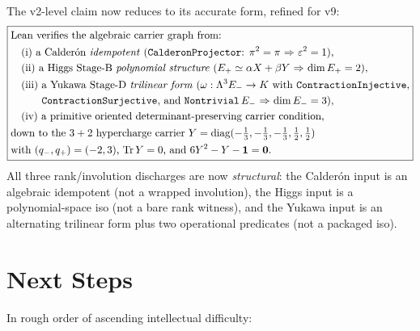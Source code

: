 \documentclass[11pt,a4paper]{article}
\begin{document}
The v2-level claim now reduces to its accurate form, refined
for v9:
\[
\boxed{
\begin{aligned}
&\text{Lean verifies the algebraic carrier graph from:}\\
&\quad\text{(i) a Calder\'on \emph{idempotent}
     ($\texttt{CalderonProjector}$: $\pi^2 = \pi$ $\Rightarrow$
     $\varepsilon^2 = 1$),}\\
&\quad\text{(ii) a Higgs Stage-B \emph{polynomial structure}
     ($E_+ \simeq \alpha X + \beta Y$ $\Rightarrow$
     $\dim E_+ = 2$),}\\
&\quad\text{(iii) a Yukawa Stage-D \emph{trilinear form}
     ($\omega : \Lambda^3 E_- \to K$ with
     \texttt{ContractionInjective},}\\
&\quad\text{\phantom{(iii) }\texttt{ContractionSurjective}, and
     \texttt{Nontrivial}\,$E_-$ $\Rightarrow$ $\dim E_- = 3$),}\\
&\quad\text{(iv) a primitive oriented
     determinant-preserving carrier condition,}\\
&\text{down to the $3+2$ hypercharge carrier
     $Y = \mathrm{diag}(-\tfrac13,-\tfrac13,-\tfrac13,\tfrac12,\tfrac12)$}\\
&\text{with $(q_-, q_+) = (-2, 3)$, $\operatorname{Tr} Y = 0$,
     and $6 Y^2 - Y - \mathbf 1 = \mathbf 0$.}
\end{aligned}
}
\]
All three rank/involution discharges are now \emph{structural}:
the Calder\'on input is an algebraic idempotent (not a wrapped
involution), the Higgs input is a polynomial-space iso (not a
bare rank witness), and the Yukawa input is an alternating
trilinear form plus two operational predicates (not a packaged
iso).

\section{Next Steps}
\label{sec:next}

In rough order of ascending intellectual difficulty:
\end{document}
